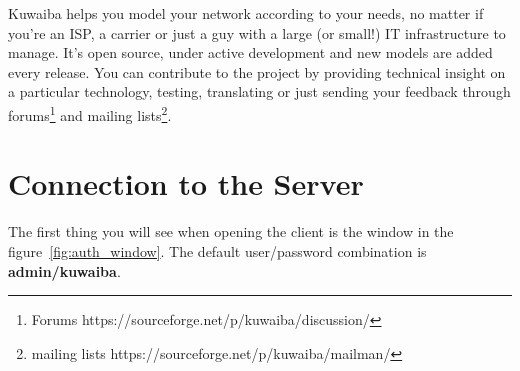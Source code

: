 \documentclass[a4paper]{article}
\begin{document}
	Kuwaiba helps you model your network according to your needs, no matter if you're an ISP, a carrier or just a guy with a large (or small!) IT infrastructure to manage. It's open source, under active development and new models are added every release. You can contribute to the project by providing technical insight on a particular technology, testing, translating or just sending your feedback through forums\footnote{Forums https://sourceforge.net/p/kuwaiba/discussion/} and mailing lists\footnote{mailing lists https://sourceforge.net/p/kuwaiba/mailman/}.
	
	\clearpage
	\section{Connection to the Server}
	The first thing you will see when opening the client is the window in the figure~\ref{fig:auth_window}. The default user/password combination is \textbf{admin/kuwaiba}.
	 
\end{document}
